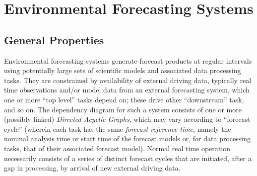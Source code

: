 \documentclass[11pt,a4paper]{article}
\begin{document}
\begin{abstract}
{    below).} This means that parallel test systems can be started (or
    restarted) behind the main operation to catch up as quickly as
    possible, systems with little downtime between forecast cycles will
    catch up from delays much faster, and historical case studies can
    achieve sustained maximal throughput. {\em Cylc} is easily
    interfaced to existing tasks and is extremely flexible and easy to
    use. It can be restarted in arbitrarily complex states of operation
    and dynamically adapts to insertion or removal of tasks.  A failed
    task will necessarily delay its downstream dependants, but the rest
    of the system can carry on unaffected while the problem is
    addressed, after which time the delayed tasks will catch up as
    quickly as possible.  {\em Cylc}'s handling of forecast model
    `restart' dependencies allows continued operation, with very little
    operator intervention, over major failures that result in omitted
    forecast cycles in the driving (upstream) models.  Ability to
    control the configured task set, and failure recovery scenarios, can
    be completely tested in an accelerated simulation mode that is
    indistinguishable (to {\em cylc}) from real operation.  {\em Cylc}
    is written in object oriented Python and uses the Python Remote
    Object Protocol ({\em Pyro}) to control tasks across a network.  

\end{abstract}

\section{Environmental Forecasting Systems}
\label{sec:FS}

\subsection{General Properties}

Environmental forecasting systems generate forecast products at regular
intervals using potentially large sets of scientific models and
associated data processing tasks. They are constrained by availability
of external driving data, typically real time observations and/or model
data from an external forecasting system, which one or more ``top
level'' tasks depend on; these drive other ``downstream'' task, and so
on. The dependency diagram for such a system consists of one or more
(possibly linked) {\em Directed Acyclic Graphs}, which may vary
according to ``forecast cycle'' (wherein each task has the same {\em
forecast reference time}, namely the nominal analysis time or start time
of the forecast models or, for data processing tasks, that of their
associated forecast model). Normal real time operation necessarily
consists of a series of distinct forecast cycles that are initiated,
after a gap in processing, by arrival of new external driving data.
\end{document}
